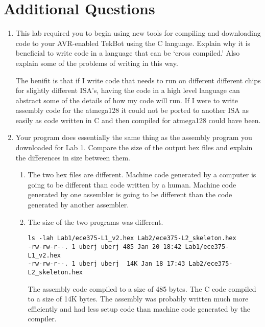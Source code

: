 \documentclass[12pt,letterpaper]{article}
\begin{document}
\section{Additional Questions}
\begin{enumerate}
    \item
    This lab required you to begin using new tools for compiling and downloading code to your
    AVR-enabled TekBot using the C language. Explain why it is beneficial to write code in a
    language that can be ‘cross compiled.’ Also explain some of the problems of writing in this way.

    The benifit is that if I write code that needs to run on different different chips for slightly
    different ISA's, having the code in a high level language can abstract some of the details of
    how my code will run. If I were to write assembly code for the atmega128 it could not be ported
    to another ISA as easily as code written in C and then compiled for atmega128 could have been.
    \item
    Your program does essentially the same thing as the assembly program you downloaded for Lab 1.
    Compare the size of the output hex files and explain the differences in size between them.

    \begin{enumerate}
        \item
        The two hex files are different. Machine code generated by a computer is going to be different
        than code written by a human. Machine code generated by one assembler is going to be different
        than the code generated by another assembler.
        \item
        The size of the two programs was different.
\begin{verbatim}
ls -lah Lab1/ece375-L1_v2.hex Lab2/ece375-L2_skeleton.hex 
-rw-rw-r--. 1 uberj uberj 485 Jan 20 18:42 Lab1/ece375-L1_v2.hex
-rw-rw-r--. 1 uberj uberj  14K Jan 18 17:43 Lab2/ece375-L2_skeleton.hex
\end{verbatim}
        The assembly code compiled to a size of 485 bytes. The C code compiled to a size of 14K
        bytes. The assembly was probably written much more efficiently and had less setup code than
        machine code generated by the compiler.

    \end{enumerate}
\end{enumerate}
\end{document}
